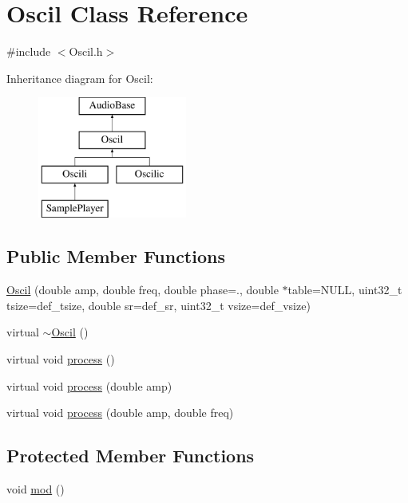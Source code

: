\hypertarget{class_oscil}{}\section{Oscil Class Reference}
\label{class_oscil}


{\ttfamily \#include $<$Oscil.\+h$>$}

Inheritance diagram for Oscil\+:\begin{figure}[H]
\begin{center}
\leavevmode
\includegraphics[height=4.000000cm]{class_oscil}
\end{center}
\end{figure}
\subsection*{Public Member Functions}
\begin{DoxyCompactItemize}
\item 
\hyperlink{class_oscil_a02ed65e22d9046e3f6253281b107b7bd}{Oscil} (double amp, double freq, double phase=., double $\ast$table=N\+U\+LL, uint32\+\_\+t tsize=def\+\_\+tsize, double sr=def\+\_\+sr, uint32\+\_\+t vsize=def\+\_\+vsize)
\item 
virtual \hyperlink{class_oscil_a3c09a41fb42bce840ca1b27cf27cf4f1}{$\sim$\+Oscil} ()
\item 
virtual void \hyperlink{class_oscil_a0e658a6f1b494286a783ce63e95f48ba}{process} ()
\item 
virtual void \hyperlink{class_oscil_a7ed04cfd228e849ddf95d09ea0aee8c2}{process} (double amp)
\item 
virtual void \hyperlink{class_oscil_abca4352d264fd66538502c72c2440784}{process} (double amp, double freq)
\end{DoxyCompactItemize}
\subsection*{Protected Member Functions}
\begin{DoxyCompactItemize}
\item 
void \hyperlink{class_oscil_a2dc5570e853d1364f753ff88f62d4e64}{mod} ()
\end{DoxyCompactItemize}


